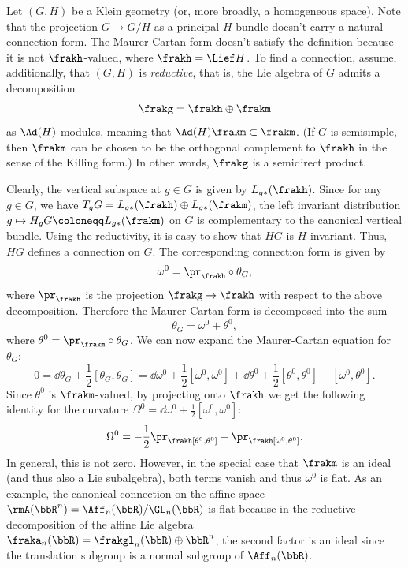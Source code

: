 \begin{example}\label{ex 1.3.19 RS2}
    Let $(G,H)$ be a Klein geometry (or, more broadly, a homogeneous space). Note that the projection $G\to G\slash H$ as a principal $H$-bundle doesn't carry a natural connection form. The Maurer-Cartan form doesn't satisfy the definition because it is not $\frakh$-valued, where $\frakh=\Lief H$. To find a connection, assume, additionally, that $(G,H)$ is \emph{reductive}, that is, the Lie algebra of $G$ admits a decomposition
    \[\frakg=\frakh\oplus\frakm\]
    as $\Ad(H)$-modules, meaning that $\Ad(H)\frakm\subset \frakm$. (If $G$ is semisimple, then $\frakm$ can be chosen to be the orthogonal complement to $\frakh$ in the sense of the Killing form.) In other words, $\frakg$ is a semidirect product.

    Clearly, the vertical subspace at $g\in G$ is given by $L_{g\ast}(\frakh)$. Since for any $g\in G$, we have $T_gG=L_{g\ast}(\frakh)\oplus L_{g\ast}(\frakm)$, the left invariant distribution $g\mapsto H_gG\coloneqq L_{g\ast}(\frakm)$ on $G$ is complementary to the canonical vertical bundle. Using the reductivity, it is easy to show that $HG$ is $H$-invariant. Thus, $HG$ defines a connection on $G$. The corresponding connection form is given by
    \[\omega^0=\pr_\frakh\circ \theta_G,\]
    where $\pr_\frakh$ is the projection $\frakg\to \frakh$ with respect to the above decomposition. Therefore the Maurer-Cartan form is decomposed into the sum
    \[\theta_G=\omega^0+\theta^0,\]
    where $\theta^0=\pr_{\frakm}\circ\theta_G$. We can now expand the Maurer-Cartan equation for $\theta_G$:
    \[0=\dd \theta_G+\frac12[\theta_G,\theta_G]=\dd \omega^0+\frac12[\omega^0,\omega^0]+\dd \theta^0+\frac12[\theta^0,\theta^0]+[\omega^0,\theta^0].\]
    Since $\theta^0$ is $\frakm$-valued, by projecting onto $\frakh$ we get the following identity for the curvature $\Omega^0=\dd\omega^0+\frac12[\omega^0,\omega^0]$:
    \[\Omega^0=-\frac12\pr_\frakh[\theta^0,\theta^0]-\pr_\frakh[\omega^0,\theta^0].\]
    In general, this is not zero. However, in the special case that $\frakm$ is an ideal (and thus also a Lie subalgebra), both terms vanish and thus $\omega^0$ is flat. As an example, the canonical connection on the affine space $\rmA(\bbR^n)=\Aff_n(\bbR)\slash \GL_n(\bbR)$ is flat because in the reductive decomposition of the affine Lie algebra $\fraka_n(\bbR)=\frakgl_n(\bbR)\oplus \bbR^n$, the second factor is an ideal since the translation subgroup is a normal subgroup of $\Aff_n(\bbR)$.
\end{example}

